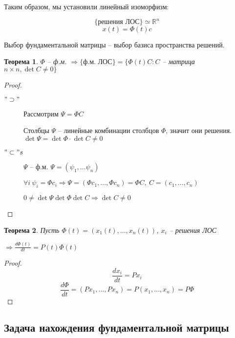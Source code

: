 \documentclass[a4paper]{article}
\theoremstyle{indented}
\newtheorem*{theorem}{Теорема}
\theoremstyle{definition}
\theoremstyle{remark}
\begin{document}
Таким образом, мы установили линейный изоморфизм:

\[\{\text{решения ЛОС} \}\simeq \mathbb{R}^n\]
\[x(t) = \Phi(t)c\]

Выбор фундаментальной матрицы -- выбор базиса пространства решений.

\begin{theorem}

  $\Phi$ -- ф.м. $\Rightarrow \{ \text{ф.м. ЛОС}\} = \{\Phi(t) C: C $ -- матрица $n \times n, \det C \neq 0\}$
\end{theorem}

\begin{proof}
  \begin{description}
  \item[$"\supset"$] Рассмотрим $\Psi = \Phi C$

    Столбцы $\Psi$ -- линейные комбинации столбцов $\Phi$, значит они решения. $\det \Psi = \det \Phi \cdot\det C \neq 0$
  \item [$"\subset"s$] $\Psi$ -- ф.м. $\Psi = (\psi_1, \ldots \psi_n)$

    $\forall i \ \psi_i =  \Phi c_i \Rightarrow \Psi = (\Phi c_1, \ldots , \Phi c_n) = \Phi C, \ C = (c_1, \ldots , c_n)$

    $0 \neq \det \Psi \det \Phi \det C \Rightarrow \det C \neq 0$
  \end{description}
\end{proof}

\begin{theorem}
  Пусть $\Phi(t) = (x_1(t) , \ldots , x_n(t))$, $x_i$ -- решения ЛОС

  $\Rightarrow \frac{d \Phi(t)}{dt} = P(t) \Phi(t)$
\end{theorem}
\begin{proof}
  \[\frac{dx_i}{dt} = Px_i\]
  \[\frac{d \Phi}{dt} = (Px_1, \ldots , Px_n) = P (x_1, \ldots , x_n) = P\Phi\]
\end{proof}

\subsection{Задача нахождения фундаментальной матрицы}
\end{document}
